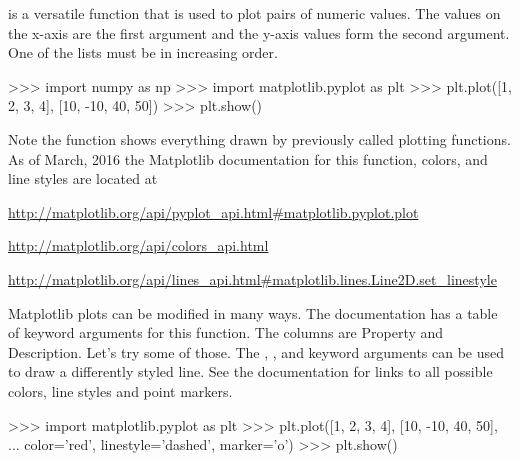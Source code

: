 \documentclass[11pt]{cselabheader}
\begin{document}
 is a versatile function that is used to plot
pairs of numeric values. The values on the x-axis are the first argument and
the y-axis values form the second argument. One of the lists must be in
increasing order.

\begin{pyconcode}
>>> import numpy as np
>>> import matplotlib.pyplot as plt
>>> plt.plot([1, 2, 3, 4], [10, -10, 40, 50])
>>> plt.show()
\end{pyconcode}

Note the  function shows everything drawn by
previously called plotting functions.  As of March, 2016 the
Matplotlib documentation for this function, colors, and line styles are
located at

\begin{center}
\url{http://matplotlib.org/api/pyplot_api.html#matplotlib.pyplot.plot}

\url{http://matplotlib.org/api/colors_api.html}

\url{http://matplotlib.org/api/lines_api.html#matplotlib.lines.Line2D.set_linestyle}
\end{center}

Matplotlib plots can be modified in many ways. The documentation has a
table of keyword arguments for this function. The columns are Property
and Description.  Let's try some of those. The ,
, and  keyword arguments
can be used to draw a differently styled line. See the documentation
for links to all possible colors, line styles and point markers.

\begin{pyconcode}
>>> import matplotlib.pyplot as plt
>>> plt.plot([1, 2, 3, 4], [10, -10, 40, 50],
...          color='red', linestyle='dashed', marker='o')
>>> plt.show()
\end{pyconcode}
\end{document}
